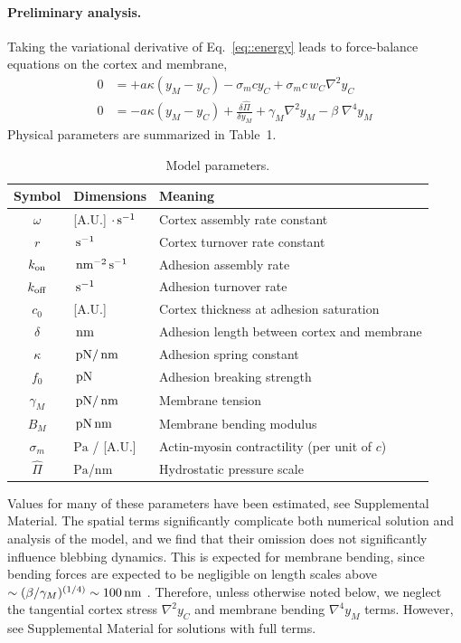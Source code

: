 \paragraph{Preliminary analysis.}
Taking the variational derivative of Eq.~\ref{eq::energy} leads to force-balance equations on the cortex and membrane,
\begin{align}
0 &= + a \kappa (y_M-y_C) - \sigma_m c y_C + \sigma_m c\, w_C \nabla^2  y_C \label{eq::forceBalanceCortex}\\
0 &= - a\kappa (y_M-y_C) + \frac{\delta \hat{\Pi}}{\delta y_M}  + \gamma_M \nabla^2  y_M - \beta\;\nabla^4 y_M \label{eq::forceBalanceMembrane}
\end{align}
Physical parameters are summarized in Table~1. 
\begin{table}[t!]
\caption{Model parameters.}\centering \label{tab:par} 
\begin{tabular}{ c  l  l}
\hline
Symbol & Dimensions & Meaning \\
\hline
$\omega$ & [A.U.] $\cdot \,\mbox{s}^{-1}$ & Cortex assembly rate constant  \\
$r$ & $\,\mbox{s}^{-1} $ & Cortex turnover rate constant \\
$k_{\mbox{\scriptsize on}}$ & $\,\mbox{nm}^{-2}\,\mbox{s}^{-1}$ & Adhesion assembly rate  \\
$k_{\mbox{\scriptsize off}} $& $ \,\mbox{s}^{-1}$ & Adhesion turnover rate \\
$c_0$ & [A.U.] & Cortex thickness at adhesion saturation \\
$\delta$ &  $\,\mbox{nm}$& Adhesion length between cortex and membrane \\
$\kappa$ & $\,\mbox{pN}/\,\mbox{nm}$ & Adhesion spring constant \\
$f_0$ & $\,\mbox{pN}$ &Adhesion breaking strength\\
$\gamma_M$ & $ \,\mbox{pN}/\,\mbox{nm}$ & Membrane tension \\
$B_M$& $\,\mbox{pN}\,\mbox{nm}$ & Membrane bending modulus \\
$\sigma_m$ & $ \mbox{Pa}$ / [A.U.] & Actin-myosin contractility (per unit of $c$) \\
$\hat\Pi$ & $ \mbox{Pa}$/nm & Hydrostatic pressure scale \\
\hline
\end{tabular}
\end{table}
Values for many of these parameters have been estimated, see Supplemental Material. The spatial terms significantly complicate both numerical solution and analysis of the model, and we find that their omission does not significantly influence blebbing dynamics. This is expected for membrane bending, since bending forces are expected to be negligible on length scales above $\sim (\beta/\gamma_M)^{(1/4)}\sim100\,\mbox{nm}$ \cite{Allard:2012gy}. Therefore, unless otherwise noted below, we neglect the tangential cortex stress $\nabla^2y_C$ and membrane bending $\nabla^4 y_M$ terms. However, see Supplemental Material for solutions with full terms. 

